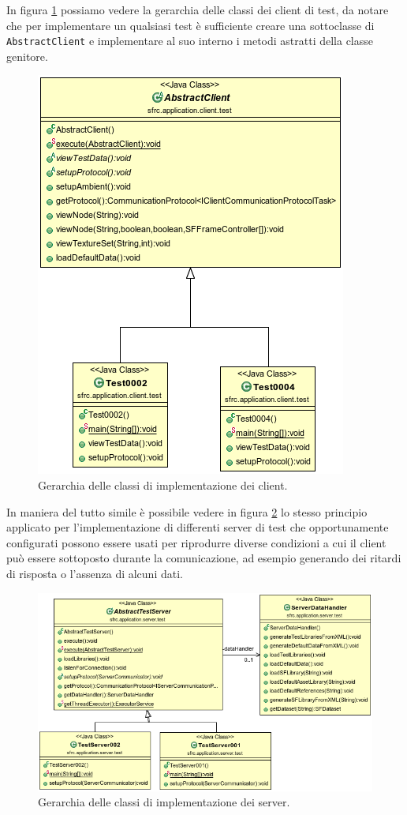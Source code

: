 In figura \ref{f:abstractclient} possiamo vedere la gerarchia delle classi dei client di test, da notare che per implementare un qualsiasi test \`e sufficiente creare una sottoclasse di \texttt{AbstractClient} e implementare al suo interno i metodi astratti della classe genitore. 
\begin{figure}
\begin{center}
\includegraphics[scale=0.85]{Immagini/abstractclient}
\caption{Gerarchia delle classi di implementazione dei client.\label{f:abstractclient}} 
\end{center} 
\end{figure}
In maniera del tutto simile \`e possibile vedere in figura \ref{f:abstractserver} lo stesso principio applicato per l'implementazione di differenti server di test che opportunamente configurati possono essere usati per riprodurre diverse condizioni a cui il client pu\`o essere sottoposto durante la comunicazione, ad esempio generando dei ritardi di risposta o l'assenza di alcuni dati.
\begin{figure}[t]
\begin{center}
\includegraphics[scale=0.75]{Immagini/abstractserver}
\caption{Gerarchia delle classi di implementazione dei server.\label{f:abstractserver}} 
\end{center} 
\end{figure}
